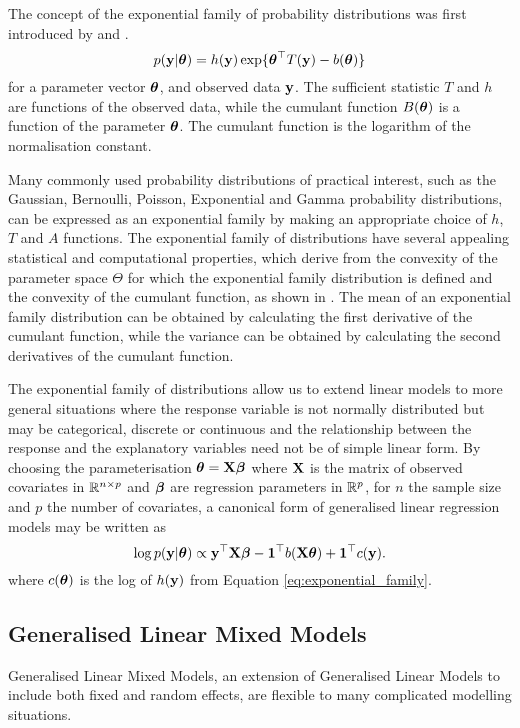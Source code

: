 The concept of the exponential family of probability distributions was first introduced by \cite{Koopman1935}
and \cite{pitman_1936}. 
\begin{equation}\label{eq:exponential_family}
	p({\bf y} | {\boldsymbol \theta}) = h({\bf y}) \exp \{ {\boldsymbol \theta}^\top T({\bf y}) - b({\boldsymbol \theta}) \}
\end{equation}
for a parameter vector ${\boldsymbol \theta}$, and observed data ${\bf y}$. The sufficient statistic $T$ and $h$ are functions
of the observed data, while the cumulant function $B({\boldsymbol \theta})$ is a function of the parameter ${\boldsymbol \theta}$. The
cumulant function is the logarithm of the normalisation constant.

Many commonly used probability distributions of practical interest, such as the Gaussian, Bernoulli, Poisson,
Exponential and Gamma probability distributions, can be expressed as an exponential family by making an
appropriate choice of $h$, $T$ and $A$ functions. The exponential family of distributions have several
appealing statistical and computational properties, which derive from the convexity of the parameter space
$\Theta$ for which the exponential family distribution is defined and the convexity of the cumulant function,
as shown in \cite{Jordan2010}. The mean of an exponential family distribution can be obtained by calculating
the first derivative of the cumulant function, while the variance can be obtained by calculating the second
derivatives of the cumulant function.

The exponential family of distributions allow us to extend linear models to more general situations where the
response variable is not normally distributed but may be categorical, discrete or continuous and the
relationship between the response and the explanatory variables need not be of simple linear form.  By
choosing the parameterisation ${\boldsymbol \theta} = {\bf X} {\boldsymbol \beta}$ where ${\bf X}$ is the matrix of observed covariates in
${\mathbb{R}}^{n \times p}$ and ${\boldsymbol \beta}$ are regression parameters in ${\mathbb{R}}^p$, for $n$ the sample size and $p$ the number
of covariates, a canonical form of generalised linear regression models may be written as
\begin{equation}\label{eq:glm}
	\log p({\bf y} | {\boldsymbol \theta}) \propto {\bf y}^\top {\bf X} {\boldsymbol\beta} - {\bf 1}^\top b({\bf X} {\boldsymbol \theta}) + {\bf 1}^\top c({\bf y}).
\end{equation}
where $c({\boldsymbol \theta})$ is the log of $h({\bf y})$ from Equation \ref{eq:exponential_family}. 

\subsection{Generalised Linear Mixed Models}
Generalised Linear Mixed Models, an extension of Generalised Linear Models to include both fixed and random
effects, are flexible to many complicated modelling situations.

